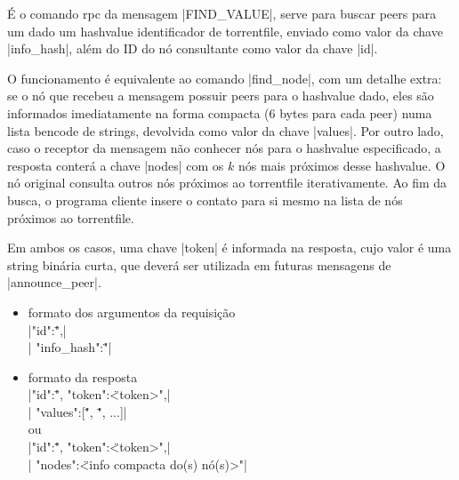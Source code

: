
\label{subsubsubsec:getpeers}

É o comando \gls*{rpc} da mensagem \bverb|FIND_VALUE|, serve para buscar \glspl*{peer}
para um dado um \gls*{hashvalue} identificador de \gls*{torrentfile}, enviado como
valor da chave \bverb|info_hash|, além do ID do nó consultante como valor da chave
\bverb|id|.

O funcionamento é equivalente ao comando \bverb|find_node|, com um detalhe extra: se o
nó que recebeu a mensagem possuir \glspl*{peer} para o \gls*{hashvalue} dado, eles são
informados imediatamente na forma compacta (6 bytes para cada \gls*{peer}) numa lista
\gls*{bencode} de \glspl*{string}, devolvida como valor da chave \bverb|values|. Por
outro lado, caso o receptor da mensagem não conhecer nós para o \gls*{hashvalue}
especificado, a resposta conterá a chave \bverb|nodes| com os $k$ nós mais próximos
desse \gls*{hashvalue}. O nó original consulta outros nós próximos ao \gls*{torrentfile}
iterativamente. Ao fim da busca, o programa cliente insere o contato para si mesmo na
lista de nós próximos ao \gls*{torrentfile}.

Em ambos os casos, uma chave \bverb|token| é informada na resposta, cujo valor é uma
\gls*{string} binária curta, que deverá ser utilizada em futuras mensagens de
\bverb|announce_peer|.


\begin{itemize}
    \item formato dos argumentos da requisição \\
        \sverb|{"id":\"<IDs dos nós consultantes>",| \\
        \sverb| "info_hash":\"<hash de 20 bytes do torrent buscado>"}|

    \item formato da resposta \\
        \sverb|{"id":\"<IDs dos nós consultados>", "token":\"<token>",| \\
        \sverb| "values":[\"<info peer 1>", \"<info peer 2>", ...]}| \\
        ou \\
        \sverb|{"id":\"<IDs dos nós consultados>", "token":\"<token>",| \\
        \sverb| "nodes":\"<info compacta do(s) nó(s)>"}| \\ \\
\end{itemize}

